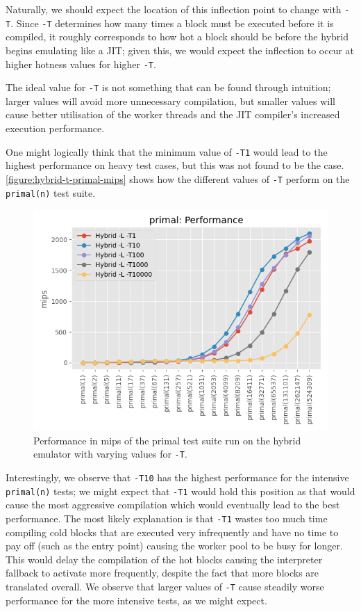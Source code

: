 Naturally, we should expect the location of this inflection point to change with \texttt{-T}. Since \texttt{-T} determines how many times a block must be executed before it is compiled, it roughly corresponds to how hot a block should be before the hybrid begins emulating like a JIT; given this, we would expect the inflection to occur at higher hotness values for higher \texttt{-T}.


The ideal value for \texttt{-T} is not something that can be found through intuition; larger values will avoid more unnecessary compilation, but smaller values will cause better utilisation of the worker threads and the JIT compiler's increased execution performance.

One might logically think that the minimum value of \texttt{-T1} would lead to the highest performance on heavy test cases, but this was not found to be the case. \autoref{figure:hybrid-t-primal-mips} shows how the different values of \texttt{-T} perform on the \texttt{primal(n)} test suite.

\begin{figure}[H]
    \centering
    \includegraphics[scale=0.75]{output/graphs/tests/hybrid_t/primal/mips.png}
    \caption{Performance in mips of the primal test suite run on the hybrid emulator with varying values for \texttt{-T}.}
    \label{figure:hybrid-t-primal-mips}
\end{figure}

Interestingly, we observe that \texttt{-T10} has the highest performance for the intensive \texttt{primal(n)} tests; we might expect that \texttt{-T1} would hold this position as that would cause the most aggressive compilation which would eventually lead to the best performance. The most likely explanation is that \texttt{-T1} wastes too much time compiling cold blocks that are executed very infrequently and have no time to pay off (such as the entry point) causing the worker pool to be busy for longer. This would delay the compilation of the hot blocks causing the interpreter fallback to activate more frequently, despite the fact that more blocks are translated overall. We observe that larger values of \texttt{-T} cause steadily worse performance for the more intensive tests, as we might expect.

